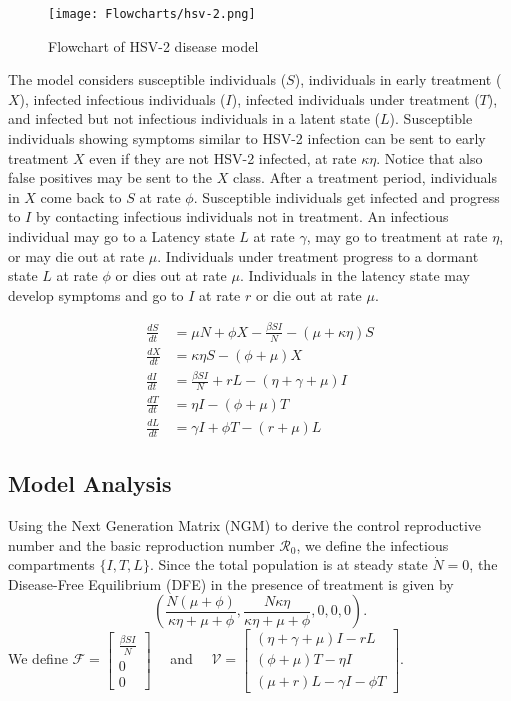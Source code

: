 \documentclass{book}\usepackage[]{graphicx}\usepackage[]{color}
\begin{document}
\begin{figure}[H]
    \centering
    \texttt{[image: Flowcharts/hsv-2.png]}
    \caption{Flowchart of HSV-2 disease model}
    \label{fig:hsv2_flow}
\end{figure}

The model considers susceptible individuals ($S$), individuals in early treatment ($X$), infected infectious individuals ($I$), infected individuals under treatment ($T$), and infected but not infectious individuals in a latent state ($L$). Susceptible individuals showing symptoms similar to HSV-2 infection can be sent to early treatment $X$ even if they are not HSV-2 infected, at rate $\kappa \eta$. Notice that also false positives may be sent to the $X$ class. After a treatment period, individuals in $X$ come back to $S$ at rate $\phi$.
Susceptible individuals get infected and progress to $I$ by contacting infectious individuals not in treatment. An infectious individual may go to a Latency state $L$ at rate $\gamma$, may go to treatment at rate $\eta$, or may die out at rate $\mu$.
Individuals under treatment progress to a dormant state $L$ at rate $\phi$ or dies out at rate $\mu$. Individuals in the latency state may develop symptoms and go to $I$ at rate $r$ or die out at rate $\mu$.

$$
\begin{aligned}
\frac{d S}{d t} &=\mu N+\phi X-\frac{\beta S I}{N}-(\mu+\kappa \eta) S \\
\frac{d X}{d t} &=\kappa \eta S-(\phi+\mu) X \\
\frac{d I}{d t} &=\frac{\beta S I}{N}+r L-(\eta+\gamma+\mu) I \\
\frac{d T}{d t} &=\eta I-\left(\phi+\mu\right) T \\
\frac{d L}{d t} &=\gamma I+\phi T-(r+\mu) L
\end{aligned}
$$


\subsection*{Model Analysis}

Using the Next Generation Matrix (NGM) to derive the control reproductive number and the basic reproduction number $\mathcal{R}_0$, we define the infectious compartments $\{I,T,L\}$. Since the total population is at steady state $\dot{N}=0$, the Disease-Free Equilibrium (DFE) in the presence of treatment is given by
$$
\left(\frac{N(\mu+\phi)}{\kappa \eta+\mu+\phi}, \frac{N\kappa \eta}{\kappa \eta+\mu+\phi}, 0,0,0\right).
$$
\noindent We define
$\mathcal{F}=\left[\begin{array}{c}\frac{\beta S I}{N} \\ 0 \\ 0\end{array}\right] \quad$ and $\quad \mathcal{V}=\left[\begin{array}{c}(\eta+\gamma+\mu) I-r L \\ (\phi+\mu) T-\eta I \\ (\mu+r) L-\gamma I-\phi T\end{array}\right]$.
\end{document}
